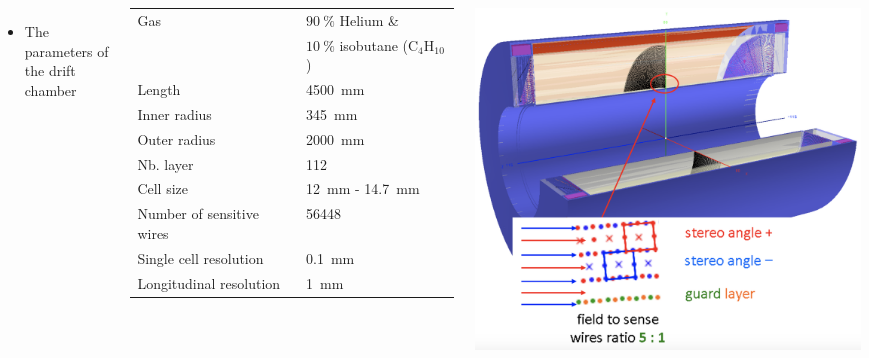 \documentclass[final,xcolor={dvipsnames,svgnames,x11names,table}]{beamer}
\begin{document}
\begin{frame}
\begin{textblock}{82}
\begin{tcolorbox}[title=The drift chamber]
  \begin{columns}

      \begin{itemize}
        \item The parameters of the drift chamber
      \end{itemize}

      \begin{tabular}{l l}
        \toprule
          Gas & $90~\%$ Helium \&\\
          & $10~\%$ isobutane ($\text{C}_{4}\text{H}_{10}$) \\
          Length & 4500~mm \\
          Inner radius & 345~mm \\
          Outer radius & 2000~mm\\
          Nb. layer & 112 \\
          Cell size & 12~mm - 14.7~mm \\
          Number of sensitive wires & 56448 \\
          Single cell resolution & 0.1~mm \\
          Longitudinal resolution & 1~mm \\
        \bottomrule
      \end{tabular}

      \centering
      \includegraphics[width=\textwidth]{Figures/DriftChamber}


\end{columns}
\end{tcolorbox}
\end{textblock}
\end{frame}
\end{document}
